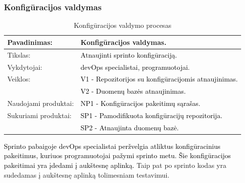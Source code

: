 \documentclass{VUMIFPSkursinis}
\begin{document}
		
	\subsubsection{Konfigūracijos valdymas}
	\begin{center}
		\begin{table}[ht]
			\caption{Konfigūracijos valdymo procesas}
			\begin{tabular}{ | l | l | }
				\hline
				Pavadinimas:         & Konfigūracijos valdymas.				\\ \hline
				Tikslas:             & \textcolor{black}{Atnaujinti sprinto konfigūraciją.}			\\ \hline
				Vykdytojai:          & \textcolor{black}{devOps specialistai, programuotojai.}			\\ \hline
				Veiklos:             & \textcolor{black}{V1 - Repozitorijos su konfigūracijomis atnaujinimas.}	\\
				                     & \textcolor{black}{V2 - Duomenų bazės atnaujinimas.	}		\\ \hline
				Naudojami produktai: & \textcolor{black}{NP1 - Konfigūracijos pakeitimų sąrašas.	}	\\ \hline
				Sukuriami produktai: & \textcolor{black}{SP1 - Pamodifikuota konfigūracijų repozitorija. }	\\
				                     & \textcolor{black}{SP2 - Atnaujinta duomenų bazė. }			\\ \hline
			\end{tabular}
		\end{table}
	\end{center}
		\textcolor{black}{Sprinto pabaigoje devOps specialistai peržvelgia atliktus konfigūracinius pakeitimus, kuriuos programuotojai pažymi sprinto metu.
		Šie konfigūracijos pakeitimai yra įdedami į aukštesnę aplinką.} Taip pat po sprinto kodas yra sudedamas į aukštesnę aplinką tolimesniam testavimui.
\end{document}
